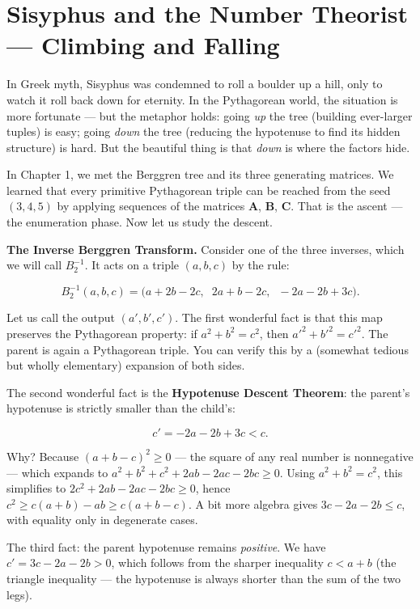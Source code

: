 \documentclass[11pt,twoside,openright]{book}
\theoremstyle{definition}
\theoremstyle{remark}
\begin{document}
\section{Sisyphus and the Number Theorist --- Climbing and Falling}

In Greek myth, Sisyphus was condemned to roll a boulder up a hill, only to watch it roll back down for eternity. In the Pythagorean world, the situation is more fortunate --- but the metaphor holds: going \textit{up} the tree (building ever-larger tuples) is easy; going \textit{down} the tree (reducing the hypotenuse to find its hidden structure) is hard. But the beautiful thing is that \textit{down} is where the factors hide.

In Chapter 1, we met the Berggren tree and its three generating matrices. We learned that every primitive Pythagorean triple can be reached from the seed $(3, 4, 5)$ by applying sequences of the matrices $\mathbf{A}$, $\mathbf{B}$, $\mathbf{C}$. That is the ascent --- the enumeration phase. Now let us study the descent.

\textbf{The Inverse Berggren Transform.} Consider one of the three inverses, which we will call $B_2^{-1}$. It acts on a triple $(a, b, c)$ by the rule:

\[B_2^{-1}(a, b, c) = \big(a + 2b - 2c,\;\; 2a + b - 2c,\;\; -2a - 2b + 3c\big).\]

Let us call the output $(a', b', c')$. The first wonderful fact is that this map preserves the Pythagorean property: if $a^2 + b^2 = c^2$, then $a'^2 + b'^2 = c'^2$. The parent is again a Pythagorean triple. You can verify this by a (somewhat tedious but wholly elementary) expansion of both sides.

The second wonderful fact is the \textbf{Hypotenuse Descent Theorem}: the parent's hypotenuse is strictly smaller than the child's:

\[c' = -2a - 2b + 3c < c.\]

Why? Because $(a + b - c)^2 \geq 0$ --- the square of any real number is nonnegative --- which expands to $a^2 + b^2 + c^2 + 2ab - 2ac - 2bc \geq 0$. Using $a^2 + b^2 = c^2$, this simplifies to $2c^2 + 2ab - 2ac - 2bc \geq 0$, hence $c^2 \geq c(a + b) - ab \geq c(a + b - c)$. A bit more algebra gives $3c - 2a - 2b \leq c$, with equality only in degenerate cases.

The third fact: the parent hypotenuse remains \textit{positive}. We have $c' = 3c - 2a - 2b > 0$, which follows from the sharper inequality $c < a + b$ (the triangle inequality --- the hypotenuse is always shorter than the sum of the two legs).
\end{document}
